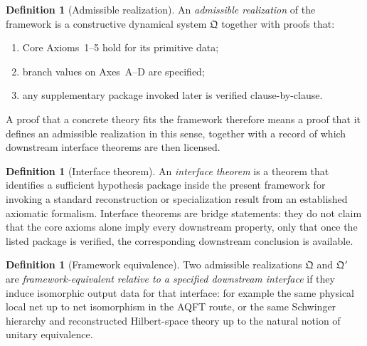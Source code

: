 \documentclass[12pt,a4paper]{article}
\theoremstyle{plain}
\theoremstyle{definition}
\newtheorem{definition}[theorem]{Definition}
\theoremstyle{remark}
\begin{document}
\begin{definition}[Admissible realization]
  \label{def:admissible-realization}
  An \emph{admissible realization} of the framework is a constructive
  dynamical system \(\mathfrak{Q}\) together with proofs that:
  \begin{enumerate}[nosep,label=(\roman*)]
  \item Core Axioms~1--5 hold for its primitive data;
  \item branch values on Axes~A--D are specified;
  \item any supplementary package invoked later is verified
    clause-by-clause.
  \end{enumerate}
  A proof that a concrete theory fits the framework therefore means a
  proof that it defines an admissible realization in this sense,
  together with a record of which downstream interface theorems are
  then licensed.
\end{definition}

\begin{definition}[Interface theorem]
  \label{def:interface-theorem}
  An \emph{interface theorem} is a theorem that identifies a
  sufficient hypothesis package inside the present framework for
  invoking a standard reconstruction or specialization result from an
  established axiomatic formalism. Interface theorems are bridge
  statements: they do not claim that the core axioms alone imply every
  downstream property, only that once the listed package is verified,
  the corresponding downstream conclusion is available.
\end{definition}

\begin{definition}[Framework equivalence]
  \label{def:framework-equivalence}
  Two admissible realizations \(\mathfrak{Q}\) and
  \(\mathfrak{Q}'\) are \emph{framework-equivalent relative to a
  specified downstream interface} if they induce isomorphic output
  data for that interface: for example the same physical local net up
  to net isomorphism in the AQFT route, or the same Schwinger
  hierarchy and reconstructed Hilbert-space theory up to the natural
  notion of unitary
  equivalence.
\end{definition}
\end{document}
